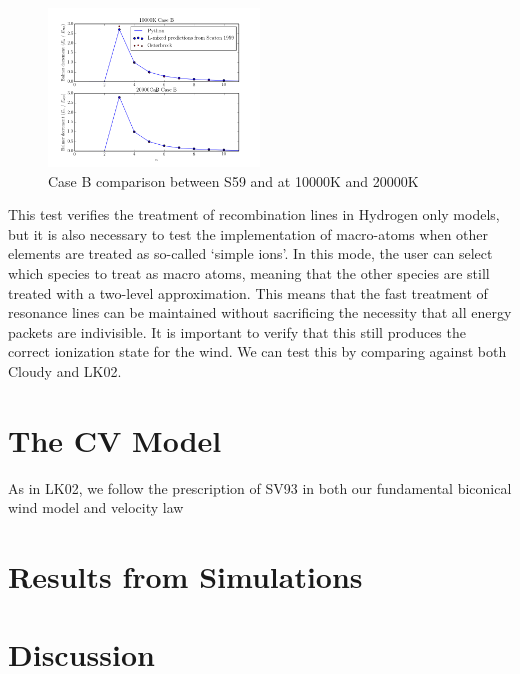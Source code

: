 \documentclass[usenatbib, a4paper]{mn2e}
\begin{document}
\begin{figure}
\includegraphics[width=0.5\textwidth]{caseB.png}
\caption{Case B comparison between S59 and \py at 10000K and 20000K}
\end{figure}

This test verifies the treatment of recombination lines in Hydrogen only models, but it is also necessary to test the implementation
of macro-atoms when other elements are treated as so-called `simple ions'. In this mode, the user can select which species to treat as
macro atoms, meaning that the other species are still treated with a two-level approximation. This means that the fast treatment of
resonance lines can be maintained without sacrificing the necessity that all energy packets are indivisible. It is important to verify that 
this still produces the correct ionization state for the wind. We can test this by comparing against both {\textsc Cloudy} and LK02.



%
%

\section{The CV Model}
As in LK02, we follow the prescription of SV93 in both our fundamental biconical wind model and velocity law


%
%

\section{Results from Simulations}


%
%


\section{Discussion}
\end{document}

